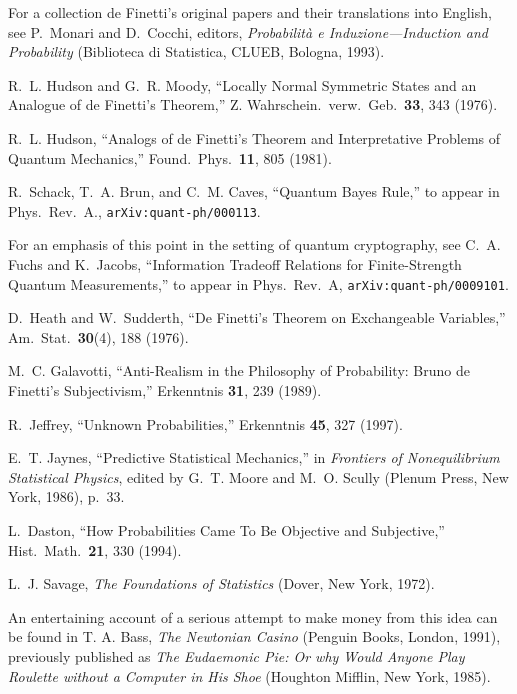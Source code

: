 \begin{thebibliography}{10}
For a collection de Finetti's original papers and their translations
into English, see P.~Monari and D.~Cocchi, editors, {\sl Probabilit\`a
e Induzione---Induc\-tion and Probability\/} (Biblioteca di Statistica,
CLUEB, Bologna, 1993).

R.~L. Hudson and G.~R. Moody, ``Locally Normal Symmetric States and
an Analogue of de Finetti's Theorem,'' Z. Wahrschein.\ verw.\ Geb.\
{\bf 33}, 343 (1976).

R.~L. Hudson, ``Analogs of de Finetti's Theorem and Interpretative
Problems of Quantum Mechanics,'' Found.\ Phys.\ {\bf 11}, 805 (1981).

R.~Schack, T.~A. Brun, and C.~M. Caves, ``Quantum Bayes Rule,''
to appear in Phys.\ Rev.~A., {\tt arXiv:quant-ph/000113}.

For an emphasis of this point in the setting of quantum
cryptography, see C.~A. Fuchs and K.~Jacobs, ``Information
Tradeoff Relations for Finite-Strength Quantum Measurements,'' to
appear in Phys.\ Rev.\ A, {\tt arXiv:quant-ph/0009101}.

D.~Heath and W.~Sudderth, ``De Finetti's Theorem on Exchangeable
Variables,'' Am.\ Stat.\ {\bf 30}(4), 188 (1976).

M.~C. Galavotti, ``Anti-Realism in the Philosophy of Probability:
Bruno de Finetti's Subjectivism,'' Erkenntnis {\bf 31}, 239 (1989).

R.~Jeffrey, ``Unknown Probabilities,'' Erkenntnis {\bf 45}, 327
(1997).

E.~T. Jaynes, ``Predictive Statistical Mechanics,'' in {\sl Frontiers
of Nonequilibrium Statistical Physics}, edited by G.~T. Moore and
M.~O. Scully (Plenum Press, New York, 1986), p.\ 33.

L.~Daston, ``How Probabilities Came To Be Objective and Subjective,''
Hist.\ Math.\ {\bf 21}, 330 (1994).

L.~J. Savage, {\sl The Foundations of Statistics\/} (Dover, New York,
1972).

An entertaining account of a serious attempt to make money from
this idea can be found in T. A. Bass, {\sl The Newtonian Casino\/}
(Penguin Books, London, 1991), previously published as {\sl The
Eudaemonic Pie: Or why Would Anyone Play Roulette without a Computer
in His Shoe\/} (Houghton Mifflin, New York, 1985).


\end{thebibliography}
